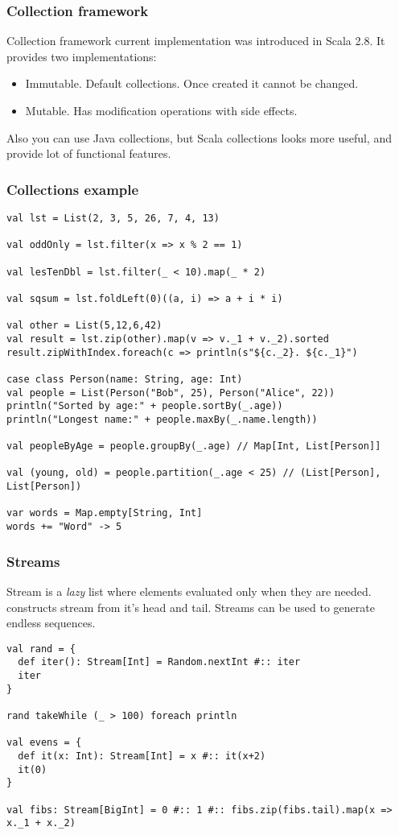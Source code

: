 \documentclass{beamer}
\begin{document}
\begin{frame}[fragile]
\frametitle{Collection framework}
Collection framework current implementation was introduced in Scala 2.8.  It provides two implementations:

\begin{itemize}
\item Immutable.  Default collections.  Once created it cannot be changed.
\item Mutable.  Has modification operations with side effects.
\end{itemize}

Also you can use Java collections, but Scala collections looks more useful, and provide lot of functional features.
\end{frame}

\begin{frame}[fragile]
\frametitle{Collections example}
\begin{lstlisting}
val lst = List(2, 3, 5, 26, 7, 4, 13)

val oddOnly = lst.filter(x => x % 2 == 1)

val lesTenDbl = lst.filter(_ < 10).map(_ * 2)

val sqsum = lst.foldLeft(0)((a, i) => a + i * i)

val other = List(5,12,6,42)
val result = lst.zip(other).map(v => v._1 + v._2).sorted
result.zipWithIndex.foreach(c => println(s"${c._2}. ${c._1}")

case class Person(name: String, age: Int)
val people = List(Person("Bob", 25), Person("Alice", 22))
println("Sorted by age:" + people.sortBy(_.age))
println("Longest name:" + people.maxBy(_.name.length))

val peopleByAge = people.groupBy(_.age) // Map[Int, List[Person]]

val (young, old) = people.partition(_.age < 25) // (List[Person], List[Person])

var words = Map.empty[String, Int]
words += "Word" -> 5
\end{lstlisting}
\end{frame}

\begin{frame}[fragile]
\frametitle{Streams}
Stream is a \emph{lazy} list where elements evaluated only when they are needed. \linline{#::} constructs stream
from it's head and tail.  Streams can be used to generate endless sequences.

\begin{lstlisting}
val rand = {
  def iter(): Stream[Int] = Random.nextInt #:: iter
  iter
}

rand takeWhile (_ > 100) foreach println

val evens = {
  def it(x: Int): Stream[Int] = x #:: it(x+2)
  it(0)
}

val fibs: Stream[BigInt] = 0 #:: 1 #:: fibs.zip(fibs.tail).map(x => x._1 + x._2)
\end{lstlisting}

\end{frame}
\end{document}
